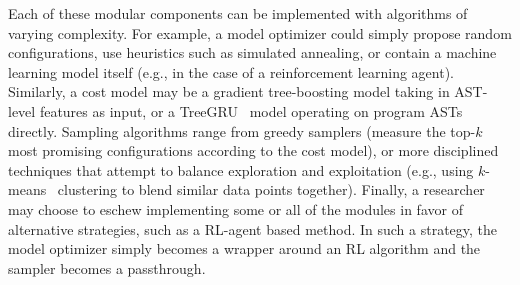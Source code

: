 Each of these modular components can be implemented with algorithms of varying complexity.
For example, a model optimizer could simply propose random configurations, use heuristics such as simulated annealing, or contain a machine learning model itself (e.g., in the case of a reinforcement learning agent).
Similarly, a cost model may be a gradient tree-boosting model taking in AST-level features as input, or a TreeGRU~\cite{Tai2015ImprovedSR} model operating on program ASTs directly.
Sampling algorithms range from greedy samplers (measure the top-$k$ most promising configurations according to the cost model), or more disciplined techniques that attempt to balance exploration and exploitation (e.g., using $k$-means~\cite{DBLP:journals/corr/abs-1905-12799} clustering to blend similar data points together).
Finally, a researcher may choose to eschew implementing some or all of the modules in favor of alternative strategies, such as a RL-agent based method.
In such a strategy, the model optimizer simply becomes a wrapper around an RL algorithm and the sampler becomes a passthrough.


